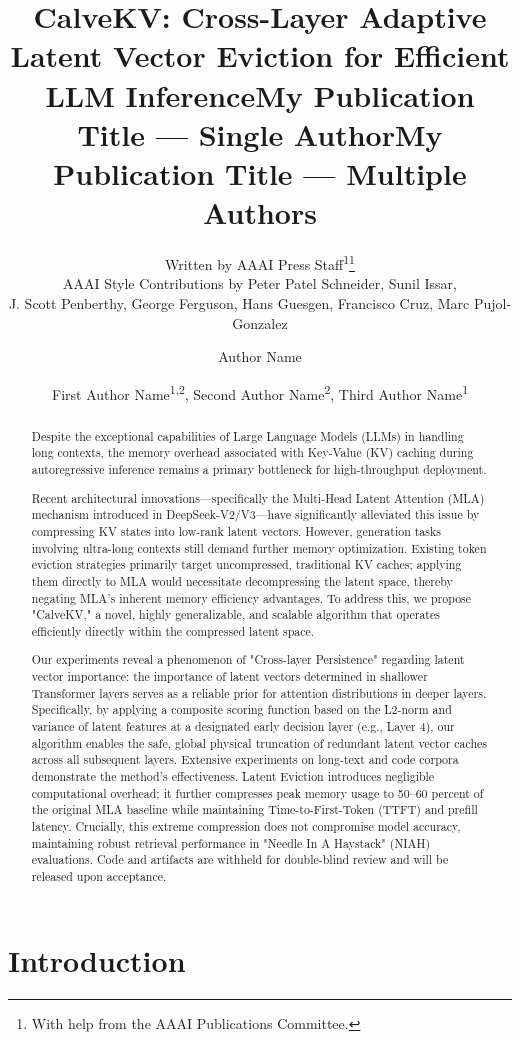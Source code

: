 \documentclass[letterpaper]{article} %
\title{CalveKV: Cross-Layer Adaptive Latent Vector Eviction for Efficient LLM Inference}
\author{
    Written by AAAI Press Staff\textsuperscript{\rm 1}\thanks{With help from the AAAI Publications Committee.}\\
    AAAI Style Contributions by Peter Patel Schneider,
    Sunil Issar,\\
    J. Scott Penberthy,
    George Ferguson,
    Hans Guesgen,
    Francisco Cruz\equalcontrib\corresponding,
    Marc Pujol-Gonzalez\equalcontrib\corresponding
}
\title{My Publication Title --- Single Author}
\author {
    Author Name
}
\title{My Publication Title --- Multiple Authors}
\author {
    First Author Name\textsuperscript{\rm 1,\rm 2}\equalcontrib,
    Second Author Name\textsuperscript{\rm 2}\equalcontrib,
    Third Author Name\textsuperscript{\rm 1}\corresponding
}
\begin{document}
\maketitle

\begin{abstract}
Despite the exceptional capabilities of Large Language Models (LLMs) in handling long contexts, the memory overhead associated with Key-Value (KV) caching during autoregressive inference remains a primary bottleneck for high-throughput deployment. 

Recent architectural innovations—specifically the Multi-Head Latent Attention (MLA) mechanism introduced in DeepSeek-V2/V3—have significantly alleviated this issue by compressing KV states into low-rank latent vectors. However, generation tasks involving ultra-long contexts still demand further memory optimization. Existing token eviction strategies primarily target uncompressed, traditional KV caches; applying them directly to MLA would necessitate decompressing the latent space, thereby negating MLA's inherent memory efficiency advantages. To address this, we propose "CalveKV," a novel, highly generalizable, and scalable algorithm that operates efficiently directly within the compressed latent space. 

Our experiments reveal a phenomenon of "Cross-layer Persistence" regarding latent vector importance: the importance of latent vectors determined in shallower Transformer layers serves as a reliable prior for attention distributions in deeper layers. Specifically, by applying a composite scoring function based on the L2-norm and variance of latent features at a designated early decision layer (e.g., Layer 4), our algorithm enables the safe, global physical truncation of redundant latent vector caches across all subsequent layers. Extensive experiments on long-text and code corpora demonstrate the method's effectiveness. Latent Eviction introduces negligible computational overhead; it further compresses peak memory usage to 50–60 percent of the original MLA baseline while maintaining Time-to-First-Token (TTFT) and prefill latency. Crucially, this extreme compression does not compromise model accuracy, maintaining robust retrieval performance in "Needle In A Haystack" (NIAH) evaluations. Code and artifacts are withheld for double-blind review and will be released upon acceptance.
\end{abstract}

\section{Introduction}
\end{document}
